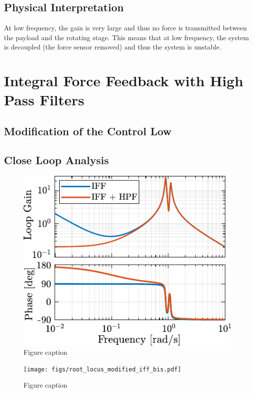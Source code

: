 \documentclass{ISMA_USD2020}
\begin{document}
\subsection{Physical Interpretation}
\label{sec:orgb2d79d2}

At low frequency, the gain is very large and thus no force is transmitted between the payload and the rotating stage.
This means that at low frequency, the system is decoupled (the force sensor removed) and thus the system is unstable.

\section{Integral Force Feedback with High Pass Filters}
\label{sec:orgabf7a6a}
\subsection{Modification of the Control Low}
\label{sec:org4766bd6}


\subsection{Close Loop Analysis}
\label{sec:org4c639fd}

\begin{figure}[htbp]
\centering
\includegraphics[scale=1]{figs/loop_gain_modified_iff.pdf}
\caption{\label{fig:loop_gain_modified_iff}Figure caption}
\end{figure}

\begin{figure}[htbp]
\centering
\texttt{[image: figs/root\_locus\_modified\_iff\_bis.pdf]}
\caption{\label{fig:root_locus_modified_iff}Figure caption}
\end{figure}
\end{document}

